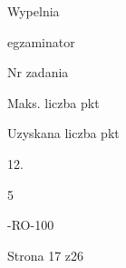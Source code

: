 \documentclass[a4paper,12pt]{article}
\begin{document}
Wypelnia

egzaminator

Nr zadania

Maks. liczba pkt

Uzyskana liczba pkt

12.

5

-RO-100

Strona 17 z26
\end{document}
